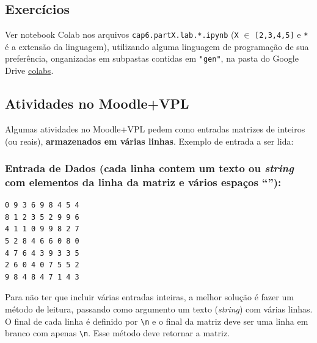 \documentclass[12pt,a4paper]{article}
\begin{document}
    \hypertarget{exercuxedcios}{%
\subsection{Exercícios}\label{exercuxedcios}}

    Ver notebook Colab nos arquivos \texttt{cap6.partX.lab.*.ipynb}
(\texttt{X} \(\in\) \texttt{{[}2,3,4,5{]}} e \texttt{*} é a extensão da
linguagem), utilizando alguma linguagem de programação de sua
preferência, onganizadas em subpastas contidas em \texttt{"gen"}, na
pasta do Google Drive
\href{https://drive.google.com/drive/folders/1YlFwv8XYN7PYYf-HwDMlkxzbmXzJw9cM?usp=sharing}{colabs}.

    \hypertarget{atividades-no-moodlevpl}{%
\subsection{Atividades no Moodle+VPL}\label{atividades-no-moodlevpl}}

Algumas atividades no Moodle+VPL pedem como entradas matrizes de
inteiros (ou reais), \textbf{armazenados em várias linhas}. Exemplo de
entrada a ser lida:

\hypertarget{entrada-de-dados-cada-linha-contem-um-texto-ou-string-com-elementos-da-linha-da-matriz-e-vuxe1rios-espauxe7os}{%
\subsubsection{\texorpdfstring{Entrada de Dados (cada linha contem um
texto ou \emph{string} com elementos da linha da matriz e vários espaços
``\texttt{}''):}{Entrada de Dados (cada linha contem um texto ou string com elementos da linha da matriz e vários espaços ``\,''):}}\label{entrada-de-dados-cada-linha-contem-um-texto-ou-string-com-elementos-da-linha-da-matriz-e-vuxe1rios-espauxe7os}}

\begin{verbatim}
0 9 3 6 9 8 4 5 4
8 1 2 3 5 2 9 9 6
4 1 1 0 9 9 8 2 7
5 2 8 4 6 6 0 8 0
4 7 6 4 3 9 3 3 5
2 6 0 4 0 7 5 5 2
9 8 4 8 4 7 1 4 3
\end{verbatim}

Para não ter que incluir várias entradas inteiras, a melhor solução é
fazer um método de leitura, passando como argumento um texto
(\emph{string}) com várias linhas. O final de cada linha é definido por
\texttt{\textbackslash{}n} e o final da matriz deve ser uma linha em
branco com apenas \texttt{\textbackslash{}n}. Esse método deve retornar
a matriz.
\end{document}
